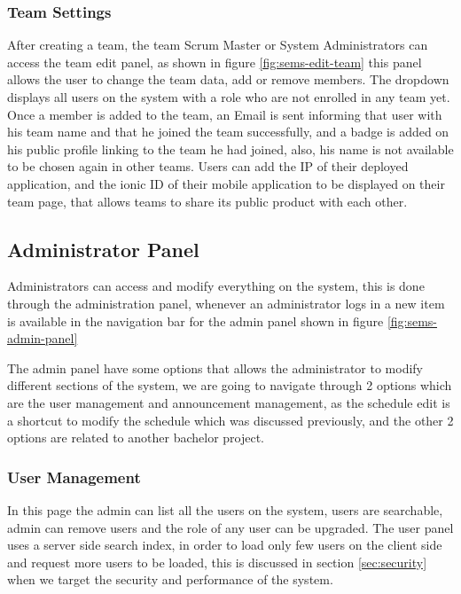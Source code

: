 \subsubsection{Team Settings}
\label{subs:team-settings}
After creating a team, the team Scrum Master or System Administrators can access the team edit panel, as shown in figure \ref{fig:sems-edit-team}
this panel allows the user to change the team data, add or remove members. The  dropdown displays all users on the system
with a  role who are not enrolled in any team yet. Once a member is added to the team, an Email is sent informing that user
with his team name and that he joined the team successfully, and a badge is added on his public profile linking to the team he had joined,
also, his name is not available to be chosen again in other teams. Users can add the IP of their deployed application, and the ionic ID of their
mobile application to be displayed on their team page, that allows teams to share its public product with each other.

\subsection{Administrator Panel}
\label{sub:admin-panel}
Administrators can access and modify everything on the system, this is done through the administration panel, whenever an administrator logs in
a new item is available in the navigation bar for the admin panel shown in figure \ref{fig:sems-admin-panel}

\newParagraph
The admin panel have some options that allows the administrator to modify different sections of the system, we are going
to navigate through 2 options which are the user management and announcement management, as the schedule edit is a shortcut to modify
the schedule which was discussed previously, and the other 2 options are related to another bachelor project.

\subsubsection{User Management}
\label{subs:admin-users}
In this page the admin can list all the users on the system, users are searchable, admin can remove users and the role of any user
can be upgraded. The user panel uses a server side search index, in order to load only few users on the client side and request more
users to be loaded, this is discussed in section \ref{sec:security} when we target the security and performance of the system.

